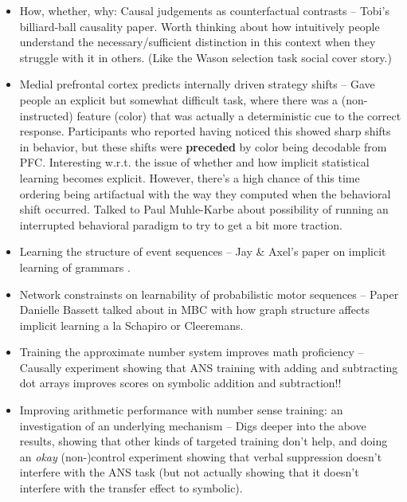 \documentclass[11pt]{article}
\begin{document}
\begin{itemize}
\item How, whether, why: Causal judgements as counterfactual contrasts -- Tobi's billiard-ball causality paper. Worth thinking about how intuitively people understand the necessary/sufficient distinction in this context when they struggle with it in others. (Like the Wason selection task social cover story.) \citep{Gerstenberg2015} \par
\item Medial prefrontal cortex predicts internally driven strategy shifts -- Gave people an explicit but somewhat difficult task, where there was a (non-instructed) feature (color) that was actually a deterministic cue to the correct response. Participants who reported having noticed this showed sharp shifts in behavior, but these shifts were \textbf{preceded} by color being decodable from PFC. Interesting w.r.t. the issue of whether and how implicit statistical learning becomes explicit. However, there's a high chance of this time ordering being artifactual with the way they computed when the behavioral shift occurred. Talked to Paul Muhle-Karbe about possibility of running an interrupted behavioral paradigm to try to get a bit more traction. \citep{Schuck2015} \par
\item Learning the structure of event sequences -- Jay \& Axel's paper on implicit learning of grammars \citep{Cleeremans1991}.
\item Network constrainsts on learnability of probabilistic motor sequences -- Paper Danielle Bassett talked about in MBC with how graph structure affects implicit learning a la Schapiro or Cleeremans. \citep{Kahn2018} 

\item Training the approximate number system improves math proficiency -- Causally experiment showing that ANS training with adding and subtracting dot arrays improves scores on symbolic addition and subtraction!! \citep{Park2013}
\item Improving arithmetic performance with number sense training: an investigation of an underlying mechanism -- Digs deeper into the above results, showing that other kinds of targeted training don't help, and doing an \textit{okay} (non-)control  experiment showing that verbal suppression doesn't interfere with the ANS task (but not actually showing that it doesn't interfere with the transfer effect to symbolic). \citep{Park2014}
\end{itemize}
\end{document}

